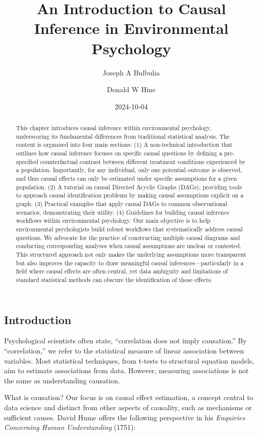 \documentclass[
  singlecolumn]{article}
\title{An Introduction to Causal Inference in Environmental Psychology}
\author{Joseph A Bulbulia}
\affil{%
             \small{     Victoria University of Wellington, New Zealand,
School of Psychology, Centre for Applied Cross-Cultural Research
          ORCID \textcolor[HTML]{A6CE39}{\aiOrcid} ~0000-0002-5861-2056 }
              }
\author{Donald W Hine}
\affil{%
             \small{     University of Canterbury, School of Psychology,
Speech and Hearing
          ORCID \textcolor[HTML]{A6CE39}{\aiOrcid} ~0000-0002-3905-7026 }
              }
\date{2024-10-04}
\begin{document}
\maketitle
\begin{abstract}
This chapter introduces causal inference within environmental
psychology, underscoring its fundamental differences from traditional
statistical analysis. The content is organised into four main sections:
(1) A non-technical introduction that outlines how causal inference
focuses on specific causal questions by defining a pre-specified
counterfactual contrast between different treatment conditions
experienced by a population. Importantly, for any individual, only one
potential outcome is observed, and thus causal effects can only be
estimated under specific assumptions for a given population. (2) A
tutorial on causal Directed Acyclic Graphs (DAGs), providing tools to
approach causal identification problems by making causal assumptions
explicit on a graph. (3) Practical examples that apply causal DAGs to
common observational scenarios, demonstrating their utility. (4)
Guidelines for building causal inference workflows within environmental
psychology. Our main objective is to help environmental psychologists
build robust workflows that systematically address causal questions. We
advocate for the practice of constructing multiple causal diagrams and
conducting corresponding analyses when causal assumptions are unclear or
contested. This structured approach not only makes the underlying
assumptions more transparent but also improves the capacity to draw
meaningful causal inferences---particularly in a field where causal
effects are often central, yet data ambiguity and limitations of
standard statistical methods can obscure the identification of those
effects.
\end{abstract}

\subsection{Introduction}\label{introduction}

Psychological scientists often state, ``correlation does not imply
causation.'' By ``correlation,'' we refer to the statistical measure of
linear association between variables. Most statistical techniques, from
t-tests to structural equation models, aim to estimate associations from
data. However, measuring associations is not the same as understanding
causation.

What is causation? Our focus is on causal effect estimation, a concept
central to data science and distinct from other aspects of causality,
such as mechanisms or sufficient causes. David Hume offers the following
perspective in his \emph{Enquiries Concerning Human Understanding}
(1751):
\end{document}
